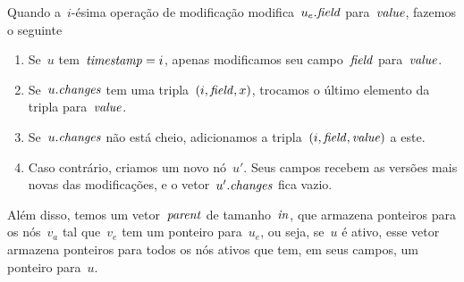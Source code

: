 \documentclass[../../main.tex]{subfiles}
\begin{document}
Quando a~$i$-ésima operação de modificação modifica~$u_e.\mathit{field}$ para~$\mathit{value}$, fazemos o seguinte
\begin{enumerate}
	\item Se~$u$ tem~$\mathit{timestamp} = i$, apenas modificamos seu campo~$\mathit{field}$ para~$\mathit{value}$.
	\item Se~$u.\mathit{changes}$ tem uma tripla~$(i, \mathit{field}, x)$, trocamos o último elemento da tripla para~$\mathit{value}$.
	\item Se~$u.\mathit{changes}$ não está cheio, adicionamos a tripla~$(i, \mathit{field}, \mathit{value})$ a este.
	\item Caso contrário, criamos um novo nó~$u'$. Seus campos recebem as versões mais novas das modificações, e o vetor~$u'.\mathit{changes}$ fica vazio.
	
\end{enumerate}

Além disso, temos um vetor~$\mathit{parent}$ de tamanho~$\mathit{in}$, que armazena ponteiros para os nós~$v_a$ tal que~$v_e$ tem um ponteiro para~$u_e$, ou seja, se~$u$ é ativo, esse vetor armazena ponteiros para todos os nós ativos que tem, em seus campos, um ponteiro para~$u$.
\end{document}
